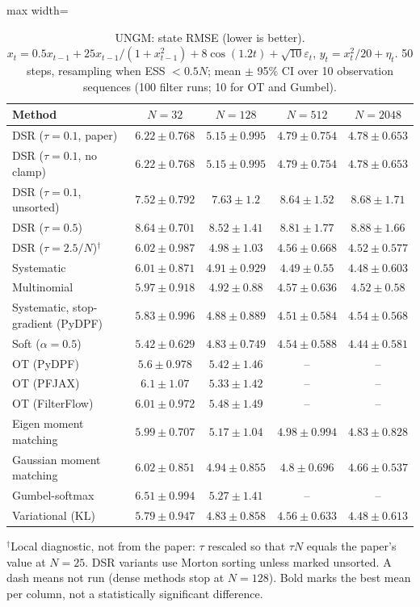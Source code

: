 \begin{table}[H]
\centering
\small
\caption{UNGM: state RMSE (lower is better). $x_t=0.5x_{t-1}+25x_{t-1}/(1+x_{t-1}^2)+8\cos(1.2t)+\sqrt{10}\varepsilon_t$, $y_t=x_t^2/20+\eta_t$. 50 steps, resampling when ESS $<0.5N$; mean $\pm$ 95\% CI over 10 observation sequences (100 filter runs; 10 for OT and Gumbel).}
\label{tab:ungm-rmse}
\begin{adjustbox}{max width=\linewidth}
\begin{tabular}{lcccc}
\toprule
Method & $N{=}32$ & $N{=}128$ & $N{=}512$ & $N{=}2048$ \\
\midrule
DSR ($\tau{=}0.1$, paper) & $6.22\pm0.768$ & $5.15\pm0.995$ & $4.79\pm0.754$ & $4.78\pm0.653$ \\
DSR ($\tau{=}0.1$, no clamp) & $6.22\pm0.768$ & $5.15\pm0.995$ & $4.79\pm0.754$ & $4.78\pm0.653$ \\
DSR ($\tau{=}0.1$, unsorted) & $7.52\pm0.792$ & $7.63\pm1.2$ & $8.64\pm1.52$ & $8.68\pm1.71$ \\
DSR ($\tau{=}0.5$) & $8.64\pm0.701$ & $8.52\pm1.41$ & $8.81\pm1.77$ & $8.88\pm1.66$ \\
DSR ($\tau{=}2.5/N$)$^\dagger$ & $6.02\pm0.987$ & $4.98\pm1.03$ & $4.56\pm0.668$ & $4.52\pm0.577$ \\
\midrule
Systematic & $6.01\pm0.871$ & $4.91\pm0.929$ & $\mathbf{4.49\pm0.55}$ & $4.48\pm0.603$ \\
Multinomial & $5.97\pm0.918$ & $4.92\pm0.88$ & $4.57\pm0.636$ & $4.52\pm0.58$ \\
Systematic, stop-gradient (PyDPF) & $5.83\pm0.996$ & $4.88\pm0.889$ & $4.51\pm0.584$ & $4.54\pm0.568$ \\
Soft ($\alpha{=}0.5$) & $\mathbf{5.42\pm0.629}$ & $\mathbf{4.83\pm0.749}$ & $4.54\pm0.588$ & $\mathbf{4.44\pm0.581}$ \\
OT (PyDPF) & $5.6\pm0.978$ & $5.42\pm1.46$ & -- & -- \\
OT (PFJAX) & $6.1\pm1.07$ & $5.33\pm1.42$ & -- & -- \\
OT (FilterFlow) & $6.01\pm0.972$ & $5.48\pm1.49$ & -- & -- \\
Eigen moment matching & $5.99\pm0.707$ & $5.17\pm1.04$ & $4.98\pm0.994$ & $4.83\pm0.828$ \\
Gaussian moment matching & $6.02\pm0.851$ & $4.94\pm0.855$ & $4.8\pm0.696$ & $4.66\pm0.537$ \\
Gumbel-softmax & $6.51\pm0.994$ & $5.27\pm1.41$ & -- & -- \\
Variational (KL) & $5.79\pm0.947$ & $4.83\pm0.858$ & $4.56\pm0.633$ & $4.48\pm0.613$ \\
\bottomrule
\end{tabular}
\end{adjustbox}
\par\smallskip\parbox{0.95\linewidth}{\footnotesize $^\dagger$Local diagnostic, not from the paper: $\tau$ rescaled so that $\tau N$ equals the paper's value at $N{=}25$. DSR variants use Morton sorting unless marked unsorted. A dash means not run (dense methods stop at $N{=}128$). Bold marks the best mean per column, not a statistically significant difference.}
\end{table}

